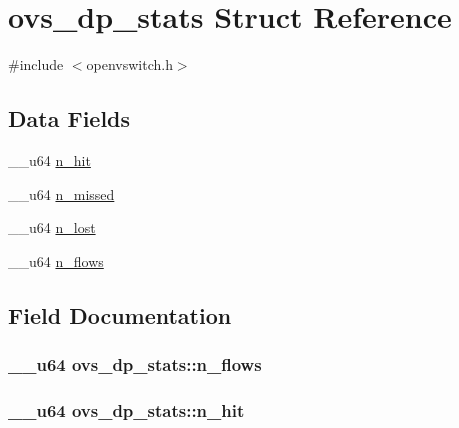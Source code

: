 \hypertarget{structovs__dp__stats}{}\section{ovs\+\_\+dp\+\_\+stats Struct Reference}
\label{structovs__dp__stats}


{\ttfamily \#include $<$openvswitch.\+h$>$}

\subsection*{Data Fields}
\begin{DoxyCompactItemize}
\item 
\+\_\+\+\_\+u64 \hyperlink{structovs__dp__stats_a0c6b8d1358632341b5e949570c5dca68}{n\+\_\+hit}
\item 
\+\_\+\+\_\+u64 \hyperlink{structovs__dp__stats_a8f1b9687593ebb43ca54c1c9904999a6}{n\+\_\+missed}
\item 
\+\_\+\+\_\+u64 \hyperlink{structovs__dp__stats_a83a104dedcf4ee3cc2a940e4043e89b2}{n\+\_\+lost}
\item 
\+\_\+\+\_\+u64 \hyperlink{structovs__dp__stats_af6bf9e903d781d713f0f5d10b2d8550f}{n\+\_\+flows}
\end{DoxyCompactItemize}


\subsection{Field Documentation}
\hypertarget{structovs__dp__stats_af6bf9e903d781d713f0f5d10b2d8550f}{}
\subsubsection[{n\+\_\+flows}]{\setlength{\rightskip}{0pt plus 5cm}\+\_\+\+\_\+u64 ovs\+\_\+dp\+\_\+stats\+::n\+\_\+flows}\label{structovs__dp__stats_af6bf9e903d781d713f0f5d10b2d8550f}
\hypertarget{structovs__dp__stats_a0c6b8d1358632341b5e949570c5dca68}{}
\subsubsection[{n\+\_\+hit}]{\setlength{\rightskip}{0pt plus 5cm}\+\_\+\+\_\+u64 ovs\+\_\+dp\+\_\+stats\+::n\+\_\+hit}\label{structovs__dp__stats_a0c6b8d1358632341b5e949570c5dca68}
\hypertarget{structovs__dp__stats_a83a104dedcf4ee3cc2a940e4043e89b2}{}
